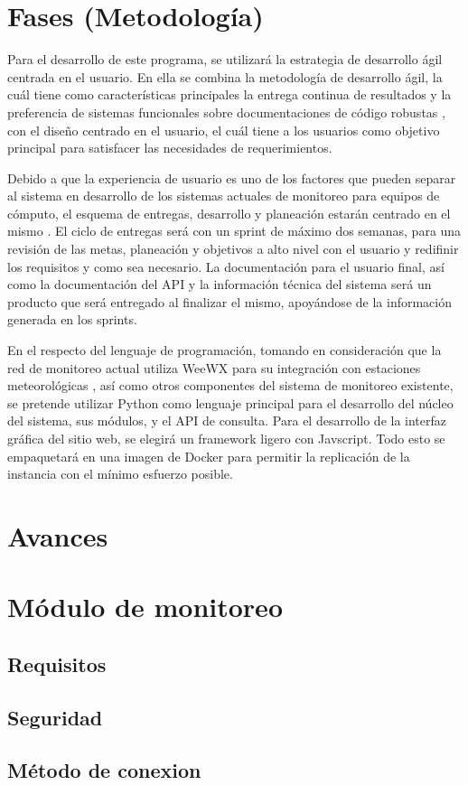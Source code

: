 \section{Fases (Metodología)}

Para el desarrollo de este programa, se utilizará la estrategia de desarrollo ágil centrada en el usuario. En ella se combina la metodología de desarrollo ágil, la cuál tiene como características principales la entrega continua de resultados y la preferencia de sistemas funcionales sobre documentaciones de código robustas \cite{agile_manifesto}, con el diseño centrado en el usuario, el cuál tiene a los usuarios como objetivo principal para satisfacer las necesidades de requerimientos.

Debido a que la experiencia de usuario es uno de los factores que pueden separar al sistema en desarrollo de los sistemas actuales de monitoreo para equipos de cómputo, el esquema de entregas, desarrollo y planeación estarán centrado en el mismo \cite{hussain_agile_usercentered}. El ciclo de entregas será con un sprint de máximo dos semanas, para una revisión de las metas, planeación y objetivos a alto nivel con el usuario y redifinir los requisitos y como sea necesario. La documentación para el usuario final, así como la documentación del API y la información técnica del sistema será un producto que será entregado al finalizar el mismo, apoyándose de la información generada en los sprints.

En el respecto del lenguaje de programación, tomando en consideración que la red de monitoreo actual utiliza WeeWX para su integración con estaciones meteorológicas \cite{red_climatologica_uacj}, así como otros componentes del sistema de monitoreo existente, se pretende utilizar Python como lenguaje principal para el desarrollo del núcleo del sistema, sus módulos, y el API de consulta. Para el desarrollo de la interfaz gráfica del sitio web, se elegirá un framework ligero con Javscript. Todo esto se empaquetará en una imagen de Docker para permitir la replicación de la instancia con el mínimo esfuerzo posible.


\section{Avances}


\section{Módulo de monitoreo}

\subsection*{Requisitos}

\subsection*{Seguridad}

\subsection*{Método de conexion}

